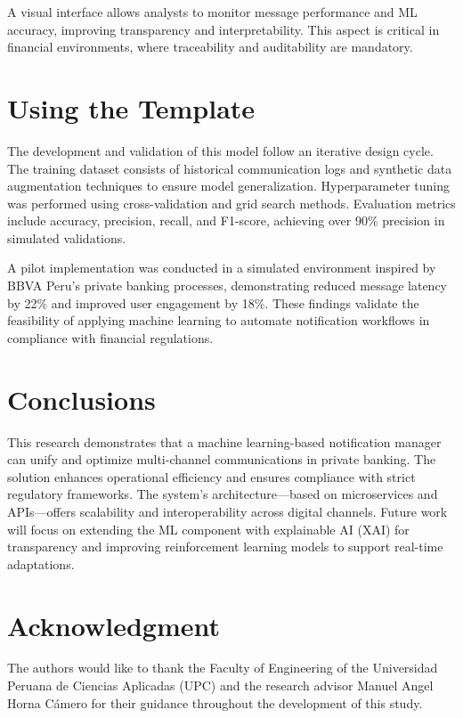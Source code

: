 \documentclass[conference]{IEEEtran}
\begin{document}
A visual interface allows analysts to monitor message performance and ML accuracy, improving transparency and interpretability. This aspect is critical in financial environments, where traceability and auditability are mandatory.

\section{Using the Template}

The development and validation of this model follow an iterative design cycle. The training dataset consists of historical communication logs and synthetic data augmentation techniques to ensure model generalization. Hyperparameter tuning was performed using cross-validation and grid search methods. Evaluation metrics include accuracy, precision, recall, and F1-score, achieving over 90\% precision in simulated validations. 

A pilot implementation was conducted in a simulated environment inspired by BBVA Peru’s private banking processes, demonstrating reduced message latency by 22\% and improved user engagement by 18\%. These findings validate the feasibility of applying machine learning to automate notification workflows in compliance with financial regulations.

\section{Conclusions}

This research demonstrates that a machine learning-based notification manager can unify and optimize multi-channel communications in private banking. The solution enhances operational efficiency and ensures compliance with strict regulatory frameworks. The system’s architecture—based on microservices and APIs—offers scalability and interoperability across digital channels. Future work will focus on extending the ML component with explainable AI (XAI) for transparency and improving reinforcement learning models to support real-time adaptations.

\section*{Acknowledgment}
The authors would like to thank the Faculty of Engineering of the Universidad Peruana de Ciencias Aplicadas (UPC) and the research advisor Manuel Angel Horna Cámero for their guidance throughout the development of this study.



\end{document}
